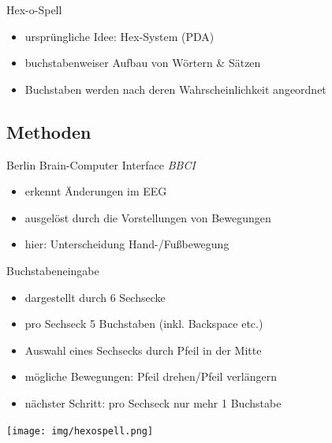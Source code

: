 \documentclass{beamer}
\begin{document}
		\begin{frame}[<+->]{Hex-o-Spell}
		  \begin{block}{}
		    \begin{itemize}
		      \item ursprüngliche Idee: Hex-System (PDA)
		      \item buchstabenweiser Aufbau von Wörtern \& Sätzen
		      \item Buchstaben werden nach deren Wahrscheinlichkeit angeordnet
		    \end{itemize}
		  \end{block}
		\end{frame}

		\subsection{Methoden}
		\begin{frame}[<+->]{Berlin Brain-Computer Interface \emph{BBCI}}
		  \begin{block}{}
		    \begin{itemize}
		      \item erkennt Änderungen im EEG
		      \item ausgelöst durch die Vorstellungen von Bewegungen
		      \item hier: Unterscheidung Hand-/Fußbewegung
		    \end{itemize}
		  \end{block}
		\end{frame}
		
		\begin{frame}[<+->]{Buchstabeneingabe}
		  \begin{block}{}
		    \begin{itemize}
		      \item dargestellt durch 6 Sechsecke
		      \item pro Sechseck 5 Buchstaben (inkl. Backspace etc.)
		      \item Auswahl eines Sechsecks durch Pfeil in der Mitte
		      \item mögliche Bewegungen: Pfeil drehen/Pfeil verlängern
		      \item nächster Schritt: pro Sechseck nur mehr 1 Buchstabe
		    \end{itemize}
		  \end{block}
		  
		  \begin{center}
	      \texttt{[image: img/hexospell.png]}
	      \label{fig:hexospell}
      \end{center}
		\end{frame}
		
\end{document}
